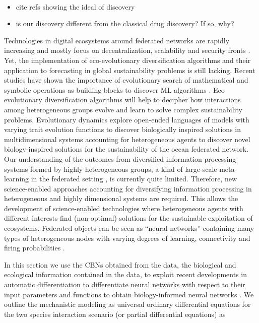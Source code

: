 \documentclass[12pt,a4paper]{article}
\begin{document}
\\
\begin{itemize}
    \item cite refs showing the ideal of discovery
    \item is our discovery different from the classical drug discovery? If so, why?
\end{itemize}

Technologies in digital ecosystems around federated networks are rapidly increasing and mostly focus on decentralization, scalability and security fronts \cite{Androulaki2018,OceanProtocolFoundation2018,BigchainDBGmbH2018}. Yet, the implementation of eco-evolutionary diversification algorithms and their application to forecasting in global sustainability problems is still lacking. Recent studies have shown the importance of evolutionary search of mathematical and symbolic operations as building blocks to discover ML algorithms \citep{Real2020,Guimera2020}. Eco evolutionary diversification algorithms will help to decipher how interactions among heterogeneous groups evolve and learn to solve complex sustainability problems. Evolutionary dynamics explore open-ended languages of models with varying trait evolution functions to discover biologically inspired solutions in multidimensional systems \citep{Real2020} accounting for heterogeneous agents to discover novel biology-inspired solutions for the sustainability of the ocean federated network. Our understanding of the outcomes from diversified information processing systems formed by highly heterogeneous groups, a kind of large-scale meta-learning in the federated setting \citep{Dilley2016}, is currently quite limited. Therefore, new science-enabled approaches accounting for diversifying information processing in heterogeneous and highly dimensional systems are required. This allows the development of science-enabled technologies where heterogeneous agents with different interests find (non-optimal) solutions for the sustainable exploitation of ecosystems. Federated objects can be seen as ``neural networks'' containing many types of heterogeneous nodes with varying degrees of learning, connectivity and firing probabilities \citep{Maass2014,Maass2015}.

In this section we use the CBNs obtained from the data, the biological and ecological information contained in the data, to exploit recent developments in automatic differentiation \citep{margossian2019review} to differentiate neural networks with respect to their input parameters and functions to obtain biology-informed neural networks \citep{lagergren2020biologically}. We outline the mechanistic modeling as universal ordinary differential equations for the two species interaction scenario (or partial differential equations) as
\end{document}
